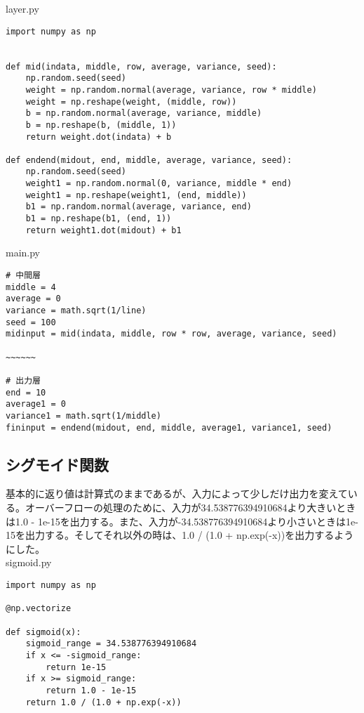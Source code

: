\documentclass{ujarticle}
\begin{document}
layer.py
\begin{lstlisting}[basicstyle=\ttfamily\footnotesize, frame=single]
import numpy as np


def mid(indata, middle, row, average, variance, seed):
    np.random.seed(seed)
    weight = np.random.normal(average, variance, row * middle)
    weight = np.reshape(weight, (middle, row))
    b = np.random.normal(average, variance, middle)
    b = np.reshape(b, (middle, 1))
    return weight.dot(indata) + b

def endend(midout, end, middle, average, variance, seed):
    np.random.seed(seed)
    weight1 = np.random.normal(0, variance, middle * end)
    weight1 = np.reshape(weight1, (end, middle))
    b1 = np.random.normal(average, variance, end)
    b1 = np.reshape(b1, (end, 1))
    return weight1.dot(midout) + b1
\end{lstlisting}

main.py
\begin{lstlisting}[basicstyle=\ttfamily\footnotesize, frame=single]
# 中間層
middle = 4
average = 0
variance = math.sqrt(1/line)
seed = 100
midinput = mid(indata, middle, row * row, average, variance, seed)

~~~~~~

# 出力層
end = 10
average1 = 0
variance1 = math.sqrt(1/middle)
fininput = endend(midout, end, middle, average1, variance1, seed)
\end{lstlisting}


\subsection{シグモイド関数}
基本的に返り値は計算式のままであるが、入力によって少しだけ出力を変えている。オーバーフローの処理のために、入力が34.538776394910684より大きいときは1.0 - 1e-15を出力する。また、入力が-34.538776394910684より小さいときは1e-15を出力する。そしてそれ以外の時は、1.0 / (1.0 + np.exp(-x))を出力するようにした。\\

sigmoid.py
\begin{lstlisting}[basicstyle=\ttfamily\footnotesize, frame=single]
import numpy as np

@np.vectorize

def sigmoid(x):
    sigmoid_range = 34.538776394910684
    if x <= -sigmoid_range:
        return 1e-15
    if x >= sigmoid_range:
        return 1.0 - 1e-15
    return 1.0 / (1.0 + np.exp(-x))
\end{lstlisting}
\end{document}
